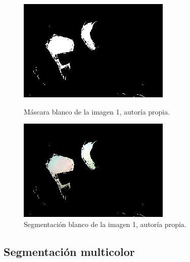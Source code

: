 \documentclass[a4paper,12pt]{article}
\begin{document}
{\begin{figure}[H]

  \begin{minipage}[t]{0.3\textwidth}
      \centering
      \includegraphics[width=\textwidth]{processed_data/white_mask_0.jpg}
      \caption{Máscara blanco de la imagen 1, autoría propia.}
      \label{fig:orange_mask}
  \end{minipage}
  \hfill
  \begin{minipage}[t]{0.3\textwidth}
      \centering
      \includegraphics[width=\textwidth]{processed_data/white_segmented_0.jpg}
      \caption{Segmentación blanco de la imagen 1, autoría propia.}
      \label{fig:orange_segmented}
  \end{minipage}
\end{figure}

\subsection{Segmentación multicolor}

}
\end{document}
